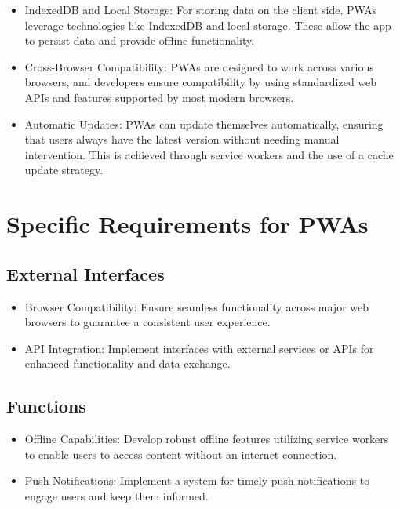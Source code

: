 \documentclass[12pt,a4paper, twosite]{article}
\begin{document}
\begin{itemize}
  \item IndexedDB and Local Storage:
    For storing data on the client side, PWAs leverage technologies like IndexedDB and local storage. These allow the app to persist data and provide offline functionality.
  
  \item Cross-Browser Compatibility:
    PWAs are designed to work across various browsers, and developers ensure compatibility by using standardized web APIs and features supported by most modern browsers.
  
  \item Automatic Updates:
    PWAs can update themselves automatically, ensuring that users always have the latest version without needing manual intervention. This is achieved through service workers and the use of a cache update strategy.
  \end{itemize}

\section{Specific Requirements for PWAs}
\label{sec:org40573d1}


\subsection{External Interfaces}
\label{sec:orgfd5391f}

\begin{itemize}
  \item Browser Compatibility: Ensure seamless functionality across major web browsers to guarantee a consistent user experience.
  \item API Integration: Implement interfaces with external services or APIs for enhanced functionality and data exchange.

\end{itemize}

\subsection{Functions}
\label{sec:org307bb59}

\begin{itemize}
  \item Offline Capabilities: Develop robust offline features utilizing service workers to enable users to access content without an internet connection.
  \item Push Notifications: Implement a system for timely push notifications to engage users and keep them informed.

\end{itemize}
\end{document}

